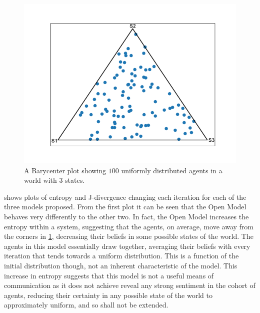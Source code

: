 \begin{figure}[H]
 \centering
  \begin{minipage}[ht]{0.45\textwidth}
    \includegraphics[width=\textwidth]{Images/Figures/OpenModel/open_model_BC_n_3_p_100_gullibility_0,3_runs_10.png}
 \end{minipage}
 \caption{ A Barycenter plot showing $100$ uniformly distributed agents in a world with 3 states.  }\label{fig:eg_bary}
\end{figure}

 shows plots of entropy and J-divergence changing each iteration for each of the three models proposed. From the first plot it can be seen that the Open Model behaves very differently to the other two. In fact, the Open Model increases the entropy within a system, suggesting that the agents, on average, move away from the corners in \cref{fig:eg_bary}, decreasing their beliefs in some possible states of the world. The agents in this model essentially draw together, averaging their beliefs with every iteration that tends towards a uniform distribution. This is a function of the initial distribution though, not an inherent characteristic of the model. This increase in entropy suggests that this model is not a useful means of communication as it does not achieve reveal any strong sentiment in the cohort of agents, reducing their certainty in any possible state of the world to approximately uniform, and so shall not be extended.


